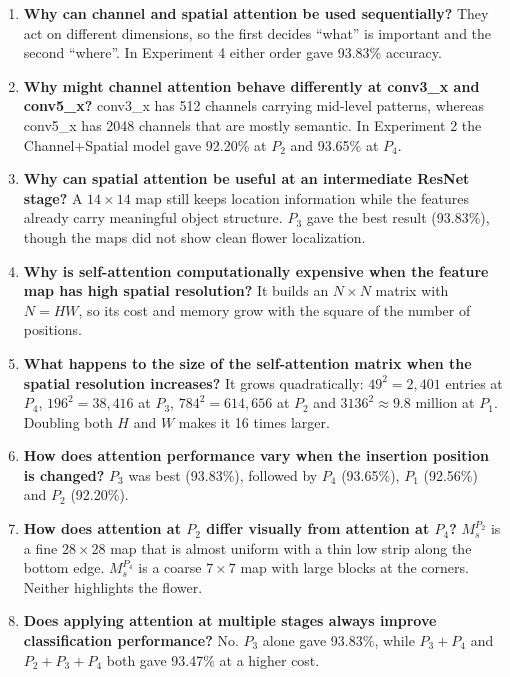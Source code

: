 \documentclass[10pt]{article}
\begin{document}
\begin{enumerate}
\item \textbf{Why can channel and spatial attention be used sequentially?}
They act on different dimensions, so the first decides ``what'' is
important and the second ``where''. In Experiment 4 either order gave
93.83\% accuracy.

\item \textbf{Why might channel attention behave differently at conv3\_x and conv5\_x?}
conv3\_x has 512 channels carrying mid-level patterns, whereas conv5\_x has
2048 channels that are mostly semantic. In Experiment 2 the Channel+Spatial
model gave 92.20\% at $P_2$ and 93.65\% at $P_4$.

\item \textbf{Why can spatial attention be useful at an intermediate ResNet stage?}
A $14\times14$ map still keeps location information while the features
already carry meaningful object structure. $P_3$ gave the best result
(93.83\%), though the maps did not show clean flower localization.

\item \textbf{Why is self-attention computationally expensive when the feature map has high spatial resolution?}
It builds an $N\times N$ matrix with $N=HW$, so its cost and memory grow
with the square of the number of positions.

\item \textbf{What happens to the size of the self-attention matrix when the spatial resolution increases?}
It grows quadratically: $49^2=2{,}401$ entries at $P_4$, $196^2=38{,}416$
at $P_3$, $784^2=614{,}656$ at $P_2$ and $3136^2\approx9.8$ million at $P_1$.
Doubling both $H$ and $W$ makes it 16 times larger.

\item \textbf{How does attention performance vary when the insertion position is changed?}
$P_3$ was best (93.83\%), followed by $P_4$ (93.65\%), $P_1$ (92.56\%) and
$P_2$ (92.20\%).

\item \textbf{How does attention at $P_2$ differ visually from attention at $P_4$?}
$M_s^{P_2}$ is a fine $28\times28$ map that is almost uniform with a thin
low strip along the bottom edge. $M_s^{P_4}$ is a coarse $7\times7$ map with
large blocks at the corners. Neither highlights the flower.

\item \textbf{Does applying attention at multiple stages always improve classification performance?}
No. $P_3$ alone gave 93.83\%, while $P_3+P_4$ and $P_2+P_3+P_4$ both gave
93.47\% at a higher cost.


\end{enumerate}
\end{document}
